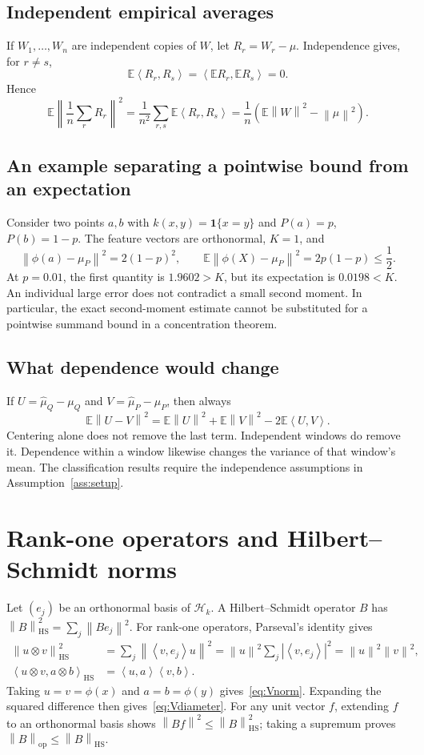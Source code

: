 \documentclass[11pt,a4paper]{article}
\theoremstyle{definition}
\theoremstyle{remark}
\newcommand{\HH}{\mathcal H_k}
\newcommand{\E}{\mathbb E}
\newcommand{\norm}[1]{\left\lVert#1\right\rVert}
\newcommand{\inner}[2]{\left\langle#1,#2\right\rangle}
\newcommand{\op}{\mathrm{op}}
\newcommand{\HS}{\mathrm{HS}}
\begin{document}
\subsection{Independent empirical averages}
If $W_1,\ldots,W_n$ are independent copies of $W$, let
$R_r=W_r-\mu$. Independence gives, for $r\ne s$,
\[
 \E\inner{R_r}{R_s}=\inner{\E R_r}{\E R_s}=0.
\]
Hence
\[
 \E\left\lVert\frac1n\sum_rR_r\right\rVert^2
 =\frac1{n^2}\sum_{r,s}\E\inner{R_r}{R_s}
 =\frac1n\left(\E\norm{W}^2-\norm{\mu}^2\right).
\]

\subsection{An example separating a pointwise bound from an expectation}
Consider two points $a,b$ with $k(x,y)=\mathbf1\{x=y\}$ and
$P(a)=p$, $P(b)=1-p$. The feature vectors are orthonormal, $K=1$,
and
\[
 \norm{\phi(a)-\mu_P}^2=2(1-p)^2,\qquad
 \E\norm{\phi(X)-\mu_P}^2=2p(1-p)\le\frac12.
\]
At $p=0.01$, the first quantity is $1.9602>K$, but its expectation
is $0.0198<K$. An individual large error does not contradict a small
second moment. In particular, the exact second-moment estimate cannot
be substituted for a pointwise summand bound in a concentration theorem.

\subsection{What dependence would change}
If $U=\widehat\mu_Q-\mu_Q$ and $V=\widehat\mu_P-\mu_P$, then always
\[
 \E\norm{U-V}^2=\E\norm{U}^2+\E\norm{V}^2
                      -2\E\inner{U}{V}.
\]
Centering alone does not remove the last term. Independent windows
do remove it. Dependence within a window likewise changes the
variance of that window's mean. The classification results require the independence assumptions in
Assumption~\ref{ass:setup}.

\section{Rank-one operators and Hilbert--Schmidt norms}\label{app:rankone}

Let $(e_j)$ be an orthonormal basis of $\HH$. A Hilbert--Schmidt
operator $B$ has $\norm{B}_{\HS}^2=\sum_j\norm{Be_j}^2$.
For rank-one operators, Parseval's identity gives
\begin{align*}
 \norm{u\otimes v}_{\HS}^2
 &=\sum_j\norm{\inner{v}{e_j}u}^2
 =\norm{u}^2\sum_j|\inner{v}{e_j}|^2
 =\norm{u}^2\norm{v}^2,\\
 \inner{u\otimes v}{a\otimes b}_{\HS}
 &=\inner{u}{a}\inner{v}{b}.
\end{align*}
Taking $u=v=\phi(x)$ and $a=b=\phi(y)$ gives~\eqref{eq:Vnorm}.
Expanding the squared difference then gives~\eqref{eq:Vdiameter}.
For any unit vector $f$, extending $f$ to an orthonormal basis shows
$\norm{Bf}^2\le\norm{B}_{\HS}^2$; taking a supremum proves
$\norm{B}_{\op}\le\norm{B}_{\HS}$.
\end{document}
